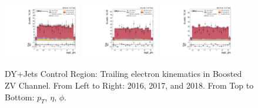 \begin{figure}[!ht]
  \includegraphics[width=0.30\textwidth]{analysis_plots/2016_zv/cr_vjets_e/lep2_phi.pdf}
  \includegraphics[width=0.30\textwidth]{analysis_plots/2017_zv/cr_vjets_e/lep2_phi.pdf}
  \includegraphics[width=0.30\textwidth]{analysis_plots/2018_zv/cr_vjets_e/lep2_phi.pdf} \\
  \caption[DY+Jets Control Region: Trailing electron kinematics in Boosted ZV Channel]%
  {DY+Jets Control Region: Trailing electron kinematics in Boosted ZV Channel. From Left to Right: 2016,
    2017, and 2018. From Top to Bottom: \( p_T \), \( \eta \), \( \phi \).}%
  \label{fig:zv-cr-vjets-e-lep2-pt-eta-phi}
\end{figure}

